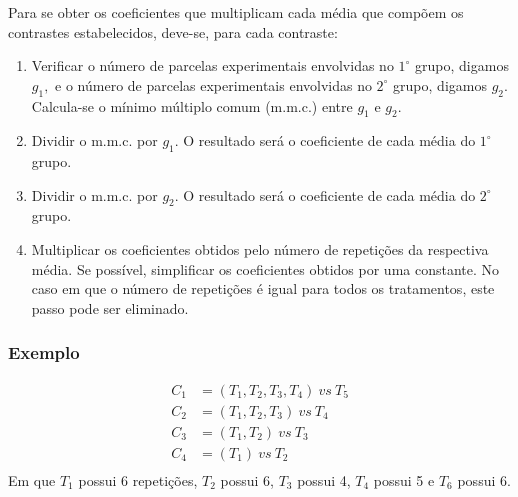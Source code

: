 \documentclass[14pt,aspectratio=1610]{beamer}
\begin{document}
\begin{frame}{}
\frametitle{}
\begin{block}{}
\justifying
Para se obter os coeficientes que multiplicam cada média que compõem os contrastes estabelecidos, deve-se, para cada contraste:
\begin{enumerate}
\item Verificar o número de parcelas experimentais envolvidas no $1^{\circ}$ grupo, digamos $g_{1},$ e o número de parcelas experimentais envolvidas no $2^{\circ}$ grupo, digamos $g_2.$ Calcula-se o mínimo múltiplo comum (m.m.c.) entre $g_1$ e $g_2.$ \pause
\item Dividir o m.m.c. por $g_1.$ O resultado será o coeficiente de cada média do $1^{\circ}$ grupo. \pause
\item Dividir o m.m.c. por $g_2.$ O resultado será o coeficiente de cada média do $2^{\circ}$ grupo. \pause
\item Multiplicar os coeficientes obtidos pelo número de repetições da respectiva média. Se possível, simplificar os coeficientes obtidos por uma constante. No caso em que o
número de repetições é igual para todos os tratamentos, este passo pode ser eliminado.
\end{enumerate}
\end{block}
\end{frame}

\begin{frame}{}
\frametitle{Exemplo}
\begin{block}{}
\justifying
\begin{align*}
C_{1}&=(T_{1},T_{2},T_{3},T_{4})\ vs\ T_{5}\\
C_{2}&=(T_{1},T_{2},T_{3})\ vs\ T_{4}\\
C_{3}&=(T_{1},T_{2})\ vs\ T_{3}\\
C_{4}&=(T_{1})\ vs\ T_{2}\\
\end{align*}
Em que $T_{1}$ possui 6 repetições, $T_{2}$ possui 6, $T_{3}$ possui 4, $T_{4}$ possui 5 e $T_{6}$ possui 6.
\end{block}
\end{frame}
\end{document}
